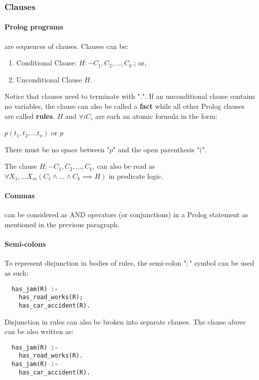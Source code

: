 \documentclass{article}
\begin{document}
\begin{multicols}{2}
  \subsubsection{Clauses}
  
  \paragraph{Prolog programs} are sequences of clauses. Clauses can be:
  
  \begin{enumerate}
  \item Conditional Clause: $H :- C_1, C_2, ..., C_k.$; or,
  \item Unconditional Clause $H.$
  \end{enumerate}
  
  \noindent Notice that clauses need to terminate with "$.$". If an unconditional clause contains no variables, the clause can also be called a {\bf fact} while all other Prolog clauses are called {\bf rules}. $H$ and $\forall i C_i$ are each an atomic formula in the form:
  
  $p(t_1, t_2, ... t_n)$ or $p$
  
  \noindent There must be no space between "$p$" and the open parenthesis "$($".
  
  The clause $H :- C_1, C_2, ..., C_k.$ can also be read as $\forall X_1, ... X_m (C_1 \land ... \land C_k \implies H)$ in predicate logic. 
  
  \paragraph{Commas} can be considered as AND operators (or conjunctions) in a Prolog statement as mentioned in the previous paragraph.
  
  \paragraph{Semi-colons} To represent disjunction in bodies of rules, the semi-colon "$;$" symbol can be used as such:
  
  \begin{lstlisting}
  has_jam(R) :-
    has_road_works(R);
    has_car_accident(R).
  \end{lstlisting}
  
  Disjunction in rules can also be broken into separate clauses. The clause above can be also written as:
  
  \begin{lstlisting}
  has_jam(R) :-
    has_road_works(R).
  has_jam(R) :-
    has_car_accident(R).
  \end{lstlisting}
  

\end{multicols}
\end{document}
